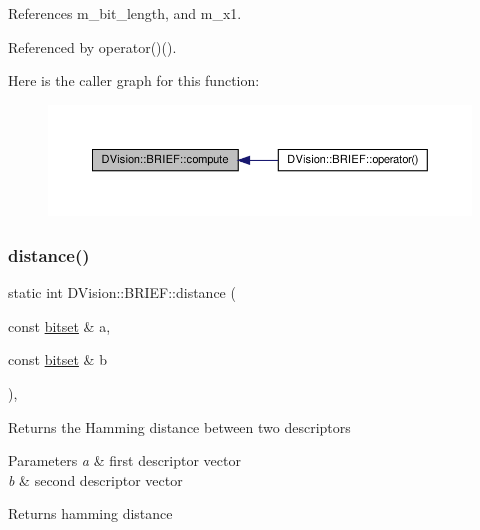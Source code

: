 References m\+\_\+bit\+\_\+length, and m\+\_\+x1.



Referenced by operator()().

Here is the caller graph for this function\+:\nopagebreak
\begin{figure}[H]
\begin{center}
\leavevmode
\includegraphics[width=350pt]{classDVision_1_1BRIEF_afda5792d22d954fabbadeed3388ca6c7_icgraph}
\end{center}
\end{figure}
\mbox{\label{classDVision_1_1BRIEF_a78718071fcf2700e3a0cc304dd4e1dcc}} 
\subsubsection{\texorpdfstring{distance()}{distance()}}
{\footnotesize\ttfamily static int D\+Vision\+::\+B\+R\+I\+E\+F\+::distance (\begin{DoxyParamCaption}\item[{const \hyperlink{classDVision_1_1BRIEF_abc56a095174a93b0741099f35230b7c5}{bitset} \&}]{a,  }\item[{const \hyperlink{classDVision_1_1BRIEF_abc56a095174a93b0741099f35230b7c5}{bitset} \&}]{b }\end{DoxyParamCaption})\hspace{0.3cm}{\ttfamily [inline]}, {\ttfamily [static]}}

Returns the Hamming distance between two descriptors 
\begin{DoxyParams}{Parameters}
{\em a} & first descriptor vector \\
\hline
{\em b} & second descriptor vector \\
\hline
\end{DoxyParams}
\begin{DoxyReturn}{Returns}
hamming distance 
\end{DoxyReturn}


